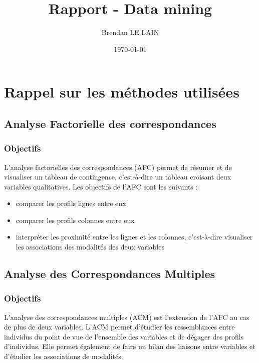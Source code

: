\documentclass[a4paper]{report}
\title {Rapport - Data mining}
\author {Brendan LE LAIN}
\date{\today}
\begin{document}
 
\pagestyle{headings}
 
\maketitle
 
\chapter{Rappel sur les méthodes utilisées}

\section{Analyse Factorielle des correspondances}

\subsection{Objectifs}
L'analyse factorielles des correspondances (AFC) permet de résumer et de visualiser un tableau de contingence, c'est-à-dire un tableau croisant deux variables qualitatives. Les objectifs de l'AFC sont les suivants :
 \begin{itemize}
 \item comparer les profils lignes entre eux
 \item comparer les profils colonnes entre eux
 \item interpréter les proximité entre les lignes et les colonnes, c'est-à-dire visualiser les associations des modalités des deux variables
 \end{itemize}

\section{Analyse des Correspondances Multiples}

\subsection{Objectifs}
L'analyse des correspondances multiples (ACM) est l'extension de l'AFC au cas de plus de deux variables. L'ACM permet d'étudier les ressemblances entre individus du point de vue de l'ensemble des variables et de dégager des profils d'individus. Elle permet également de faire un bilan des liaisons entre variables et d'étudier les associations de modalités.
\end{document}
